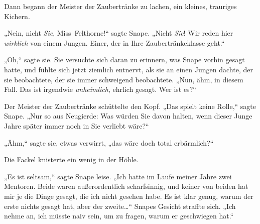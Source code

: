 Dann begann der Meister der Zaubertränke zu lachen, ein kleines, trauriges Kichern.

„Nein, nicht \emph{Sie}, Miss~Felthorne!“ sagte Snape. „Nicht \emph{Sie}! Wir reden hier \emph{wirklich} von einem Jungen. Einer, der in Ihre Zaubertränkeklasse geht.“

„Oh,“ sagte sie. Sie versuchte sich daran zu erinnern, was Snape vorhin gesagt hatte, und fühlte sich jetzt ziemlich entnervt, als sie an einen Jungen dachte, der sie beobachtete, der sie immer schweigend beobachtete. „Nun, ähm, in diesem Fall. Das ist irgendwie \emph{unheimlich}, ehrlich gesagt. Wer ist es?“

Der Meister der Zaubertränke schüttelte den Kopf. „Das spielt keine Rolle,“ sagte Snape. „Nur so aus Neugierde: Was würden Sie davon halten, wenn dieser Junge Jahre später immer noch in Sie verliebt wäre?“

„Ähm,“ sagte sie, etwas verwirrt, „das wäre doch total erbärmlich?“

Die Fackel knisterte ein wenig in der Höhle.

„Es ist seltsam,“ sagte Snape leise. „Ich hatte im Laufe meiner Jahre zwei Mentoren. Beide waren außerordentlich scharfsinnig, und keiner von beiden hat mir je die Dinge gesagt, die ich nicht gesehen habe. Es ist klar genug, warum der erste nichts gesagt hat, aber der zweite…“ Snapes Gesicht straffte sich. „Ich nehme an, ich müsste naiv sein, um zu fragen, warum er geschwiegen hat.“


